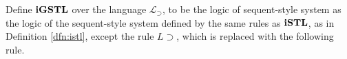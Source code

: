 \begin{dfn}\label{dfn:igstl}
	Define $\igstl$ over the language $\mathcal{L}_\supset$, to be the logic of sequent-style system as the logic of the sequent-style system defined by the same rules as $\istl$, as in Definition \ref{dfn:istl}, except the rule $L \supset$, which is replaced with the following rule.
\end{dfn}
\begin{prooftree}
\end{prooftree}